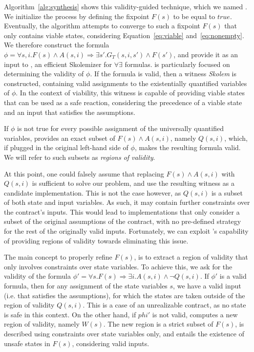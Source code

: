 Algorithm~\ref{alg:synthesis} shows this validity-guided technique, which we
named \jsynvg.
We initialize the process by defining the fixpoint $F(s)$ to be equal to $true$.
Eventually, the algorithm attempts to converge to such a fixpoint $F(s)$ that
only contains viable states, considering Equation~\ref{eq:viable}
and~\ref{eq:nonempty}.
We therefore construct the formula $\phi = \forall s,i. F(s) \land A(s,i)
\Rightarrow \exists s'.
			G_{T}(s,i,s') \land F(s')$, and provide it as an input to \aeval, an efficient
Skolemizer for $\forall\exists$ formulas. \aeval is particularly focused on
determining the validity of $\phi$. If the formula is valid, then a witness
\textit{Skolem} is constructed, containing valid assignments to the
existentially quantified variables of $\phi$. In the context of viability, this
witness is capable of providing viable states that can be used as a safe
reaction, considering the precedence of a viable state and an input that
satisfies the assumptions.

If $\phi$ is not true for every possible assignment of the universally
quantified variables, \aeval provides an exact subset of $F(s) \land A(s,i)$, namely
$Q(s,i)$, which, if plugged in the original left-hand side of $\phi$, makes the
resulting formula valid. We will refer to such subsets as \textit{regions of
validity}.

At this point, one could falsely assume that replacing $F(s) \land A(s,i)$ with
$Q(s,i)$ is sufficient to solve our problem, and use the resulting witness as a
candidate implementation. This is not the case however, as $Q(s,i)$ is a subset
of both state and input variables. As such, it may contain further constraints
over the contract's inputs. This would lead to implementations that only
consider a subset of the original assumptions of the contract, with no
pre-defined strategy for the rest of the originally valid inputs.
Fortunately, we can exploit \aeval's capability of providing regions of validity
towards eliminating this issue.

The main concept to properly refine $F(s)$, is to extract a region of validity
that only involves constraints over state variables. To achieve this, we ask for
the validity of the formula $\phi' = \forall s. F(s) \Rightarrow \exists
i. A(s,i) \land \lnot Q(s,i)$. If $\phi'$ is a valid formula, then for any
assignment of the state variables $s$, we have a valid input (i.e. that
satisfies the assumptions), for which the states are taken outside of the region
of validity $Q(s,i)$. This is a case of an unrealizable contract, as no state is
safe in this context. On the other hand, if $phi'$ is not valid, \aeval computes
a new region of validity, namely $W(s)$. The new region is a strict subset of
$F(s)$, is described using constraints over state variables only, and entails
the existence of unsafe states in $F(s)$, considering valid inputs.


